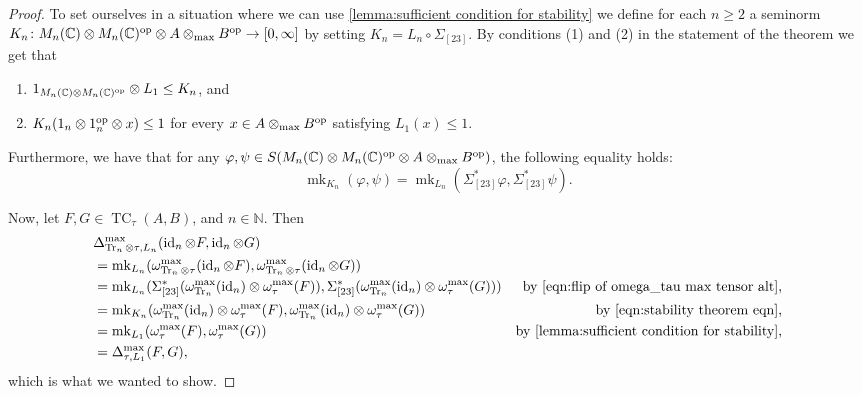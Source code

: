 \documentclass[11pt, a4paper, oneside, final, reqno]{amsart}
\newcommand{\bbN}{\mathbb{N}}
\newcommand{\bbC}{\mathbb{C}}
\newcommand{\TC}{\operatorname{TC}}
\newcommand{\id}{\operatorname{id}}
\newcommand{\Tr}{\operatorname{Tr}}
\newcommand{\mk}{\operatorname{mk}}
\theoremstyle{definition}
\theoremstyle{plain}
\theoremstyle{remark}
\numberwithin{equation}{section}
\begin{document}
\begin{proof}
    To set ourselves in a situation where we can use \cref{lemma:sufficient condition for stability} we define for each $n \geq 2$ a seminorm $K_n \colon M_n(\bbC) \otimes M_n(\bbC)^{\rm op} \otimes A \otimes_{\rm max} B^{\rm op} \to [0,\infty]$ by setting $K_n = L_n \circ \Sigma_{[23]}$. By conditions (1) and (2) in the statement of the theorem we get that
    \begin{enumerate}
        \item $1_{M_n(\bbC) \otimes M_n(\bbC)^{\rm op}}\otimes L_1 \leq K_n$, and
        \item $K_n(1_n \otimes 1_n^{\rm op} \otimes x) \leq 1$ for every $x \in A \otimes_{\rm max} B^{\rm op}$ satisfying $L_1(x) \leq 1$.
    \end{enumerate}
    Furthermore, we have that for any $\varphi, \psi \in S(M_n(\bbC) \otimes M_n(\bbC)^{\rm op} \otimes A \otimes_{\rm max} B^{\rm op})$, the following equality holds:
    \begin{equation}\label{eqn:stability theorem eqn}
        \mk_{K_n}(\varphi,\psi) = \mk_{L_n}(\Sigma_{[23]}^*\varphi, \Sigma_{[23]}^*\psi).
    \end{equation}

    Now, let $F,G \in \TC_{\tau}(A,B)$, and $n \in \bbN$. Then
    \begin{align*}
        & \Delta_{\Tr_n \otimes \tau, L_n}^{\rm max}(\id_n \otimes F, \id_n \otimes G) & \\
        & = \mk_{L_n}(\omega_{\Tr_n \otimes \tau}^{\rm max}(\id_n \otimes F), \omega_{\Tr_n \otimes \tau}^{\rm max}(\id_n \otimes G)) & \\
        & = \mk_{L_n}(\Sigma_{[23]}^*(\omega_{\Tr_n}^{\rm max}(\id_n) \otimes \omega_{\tau}^{\rm max}(F)), \Sigma_{[23]}^*(\omega_{\Tr_n}^{\rm max}(\id_n) \otimes \omega_{\tau}^{\rm max}(G))) & \text{by \eqref{eqn:flip of omega_tau max tensor alt},} \\
        & = \mk_{K_n}(\omega_{\Tr_n}^{\rm max}(\id_n) \otimes \omega_{\tau}^{\rm max}(F), \omega_{\Tr_n}^{\rm max}(\id_n) \otimes \omega_{\tau}^{\rm max}(G)) & \text{by \eqref{eqn:stability theorem eqn},} \\
        & = \mk_{L_1}(\omega_{\tau}^{\rm max}(F), \omega_{\tau}^{\rm max}(G)) & \text{by \cref{lemma:sufficient condition for stability},} \\
        & = \Delta_{\tau, L_1}^{\rm max}(F,G), &
    \end{align*}
    which is what we wanted to show.
\end{proof}
\end{document}

